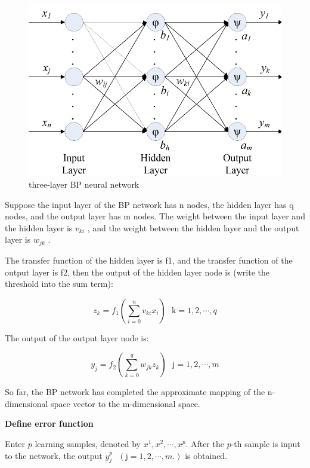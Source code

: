 \documentclass[12pt]{article}  %
\begin{document}
\begin{figure}[h!]
\centering
\includegraphics[scale=0.5]{f2.png}
\caption{three-layer BP neural network}
\label{fig:bp2}
\end{figure}

Suppose the input layer of the BP network has n nodes, the hidden layer has q nodes, and the output layer has m nodes. The weight between the input layer and the hidden layer is $v_{k i}$ , and the weight between the hidden layer and the output layer is  $w_{j k}$ .

The transfer function of the hidden layer is f1, and the transfer function of the output layer is f2, then the output of the hidden layer node is (write the threshold into the sum term):

\begin{equation}\label{eq:heat4}z_{k}=f_{1}\left(\sum_{i=0}^{n} v_{k i} x_{i}\right)   
 \ \ \ \mathrm{k}=1, 2, \cdots, q\end{equation}

The output of the output layer node is:

\begin{equation}\label{eq:heat5}y_{j}=f_{2}\left(\sum_{k=0}^{q} w_{j k} z_{k}\right)
 \ \ \ \mathrm{j}=1, 2, \cdots,m
\end{equation}

So far, the BP network has completed the approximate mapping of the n-dimensional space vector to the m-dimensional space.

\textbf{Define error function}

Enter $p$ learning samples, denoted by $x^{1},x^{2},\cdots,x^{p}$. After the  $p$-th sample is input to the network, the output  $y_{j}^{p}  \ \ \ 
\left(\mathrm{j}=1, 2, \cdots,m .\right)$ is obtained.
\end{document}
